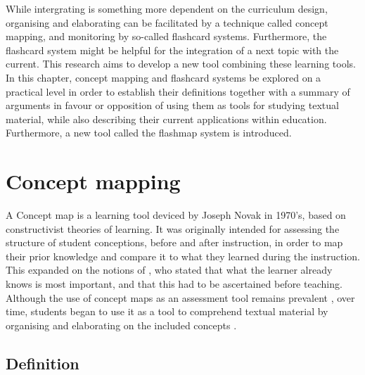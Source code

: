 While intergrating is something more dependent on the curriculum design, organising and elaborating can be facilitated by a technique called concept mapping, and monitoring by so-called flashcard systems. Furthermore, the flashcard system might be helpful for the integration of a next topic with the current. This research aims to develop a new tool combining these learning tools. In this chapter, concept mapping and flashcard systems be explored on a practical level in order to establish their definitions together with a summary of arguments in favour or opposition of using them as tools for studying textual material, while also describing their current applications within education. Furthermore, a new tool called the flashmap system is introduced.

\section{Concept mapping}
\label{sec:intro_cmap}

A Concept map is a learning tool deviced by Joseph Novak in 1970's, based on constructivist theories of learning. It was originally intended for assessing the structure of student conceptions, before and after instruction, in order to map their prior knowledge and compare it to what they learned during the instruction. This expanded on the notions of , who stated that what the learner already knows is most important, and that this had to be ascertained before teaching. Although the use of concept maps as an assessment tool remains prevalent \cite{canas, chung, hwang2, ruiz1}, over time, students began to use it as a tool to comprehend textual material by organising and elaborating on the included concepts \cite{canas, eppler, hwang2, karpicke2, nesbit}.

\subsection{Definition}


